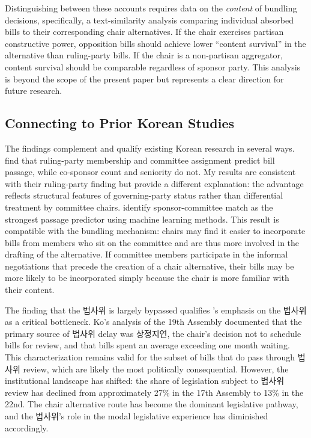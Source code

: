 \documentclass[11pt]{article}
\begin{document}
Distinguishing between these accounts requires data on the \textit{content} of bundling decisions, specifically, a text-similarity analysis comparing individual absorbed bills to their corresponding chair alternatives. If the chair exercises partisan constructive power, opposition bills should achieve lower ``content survival'' in the alternative than ruling-party bills. If the chair is a non-partisan aggregator, content survival should be comparable regardless of sponsor party. This analysis is beyond the scope of the present paper but represents a clear direction for future research.

\subsection{Connecting to Prior Korean Studies}

The findings complement and qualify existing Korean research in several ways. \citet{parkshin2019} find that ruling-party membership and committee assignment predict bill passage, while co-sponsor count and seniority do not. My results are consistent with their ruling-party finding but provide a different explanation: the advantage reflects structural features of governing-party status rather than differential treatment by committee chairs. \citet{anparklee2025} identify sponsor-committee match as the strongest passage predictor using machine learning methods. This result is compatible with the bundling mechanism: chairs may find it easier to incorporate bills from members who sit on the committee and are thus more involved in the drafting of the alternative. If committee members participate in the informal negotiations that precede the creation of a chair alternative, their bills may be more likely to be incorporated simply because the chair is more familiar with their content.

The finding that the 법사위 is largely bypassed qualifies \citet{ko2017}'s emphasis on the 법사위 as a critical bottleneck. Ko's analysis of the 19th Assembly documented that the primary source of 법사위 delay was 상정지연, the chair's decision not to schedule bills for review, and that bills spent an average exceeding one month waiting. This characterization remains valid for the subset of bills that do pass through 법사위 review, which are likely the most politically consequential. However, the institutional landscape has shifted: the share of legislation subject to 법사위 review has declined from approximately 27\% in the 17th Assembly to 13\% in the 22nd. The chair alternative route has become the dominant legislative pathway, and the 법사위's role in the modal legislative experience has diminished accordingly.
\end{document}
